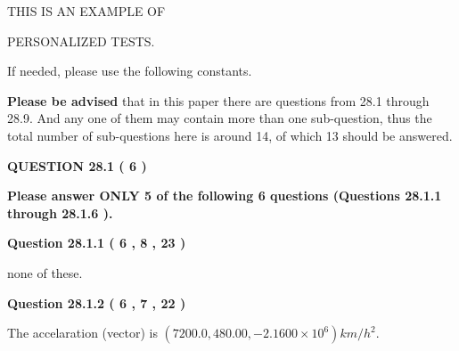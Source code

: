 \documentclass[12pt]{article}
\begin{document}
   
   
   
 \vspace{0.2in}
 
 
{\Huge  THIS IS AN EXAMPLE OF}
 
{\Huge  PERSONALIZED TESTS. }
 
If needed, please use the following constants.
 
 
 
{\textbf{\large{Please be advised}}} that in this paper there are questions from
28.1 through
28.9.
And any one of them may contain more than one sub-question, thus the total number
of sub-questions here is around 14, of which
13 should be answered.
 
\vspace{0.3in}
 
 
   
   
  
\vspace{0.2in}
  
{\textbf{\Large{QUESTION
28.1 
 (           6 )
}}}
  
  
{\textbf{\Large{Please answer ONLY  %
           5  %
 of the following  %
           6  %
 questions (Questions  %
28.1.1 %
 through  %
28.1.6 %
 ). }}}
   
   
  
\vspace{0.2in}
  
{\textbf{\Large{Question
28.1.1 
 (           6 ,           8 ,          23 )
}}}
  
  
 
 
\noindent{}
 
 
none of these.
 
 
 
 
  
\vspace{0.2in}
  
{\textbf{\Large{Question
28.1.2 
 (           6 ,           7 ,          22 )
}}}
  
  
 
 
\noindent{}
 
 
The accelaration (vector) is
$(
7200.0,
480.00 ,
-2.1600 \times 10^{6}
)km/h^2.
$
 
 
 
 
  
\vspace{0.2in}
  
\end{document}
